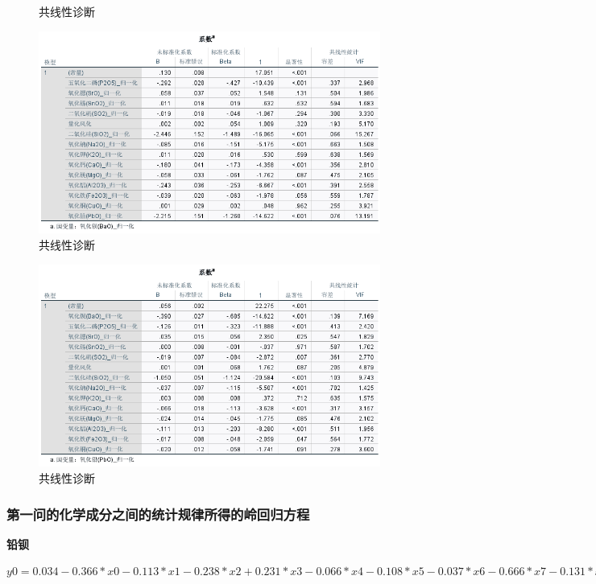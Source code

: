 \documentclass[UTF8]{ctexart}
\begin{document}
\begin{figure}[H]
    \caption{共线性诊断} %
\end{figure}\begin{figure}[H]\centering
    \includegraphics[width=1\textwidth,height=0.6\textwidth]{img/1 (29).png} %
    \caption{共线性诊断} %
\end{figure}\begin{figure}[H]\centering
    \includegraphics[width=1\textwidth,height=0.6\textwidth]{img/1 (30).png} %
    \caption{共线性诊断} %
\end{figure}

\subsubsection*{第一问的化学成分之间的统计规律所得的岭回归方程}

\noindent\textbf{铅钡}


\noindent $y0 = 0.034 - 0.366 * x0 - 0.113 * x1 - 0.238 * x2 + 0.231 * x3 - 0.066 * x4 - 0.108 * x5 - 0.037 * x6 - 0.666 * x7 - 0.131 * x8 - 0.188 * x9 + 0.072 * x10 + 0.009 * x11 + 0.028 * x12 + 0.013 * x14$
\end{document}
